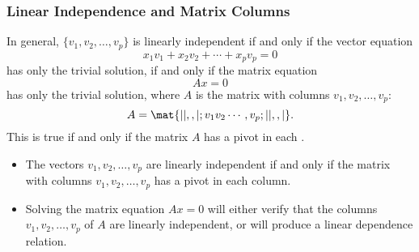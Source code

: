 
\begin{frame}
\frametitle{Linear Independence and Matrix Columns}

In general, $\{v_1,v_2,\ldots,v_p\}$ is linearly independent 
\pause
if and only if the
vector equation
\[ x_1v_1 + x_2v_2 + \cdots + x_pv_p = 0 \]
has only the trivial solution, 
\pause
if and only if the matrix equation
\[ Ax = 0 \]
has only the trivial solution, where $A$ is the matrix
\pause
with columns $v_1,v_2,\ldots,v_p$:
\[ A = \mat{| |, , |; v_1 v_2 \cdots, v_p; | |, , |}. \]
\pause
This is true if and only if the matrix $A$ has a pivot
in each .

\pause[7]\smallskip

\begin{bluebox}[Important]{.9\textwidth}
  \begin{itemize}
  \item The vectors $v_1,v_2,\ldots,v_p$ are linearly independent if and only if
    the matrix with columns $v_1,v_2,\ldots,v_p$ has a pivot in each column.
    \pause
  \item Solving the matrix equation $Ax=0$ will either verify that the columns
    $v_1,v_2,\ldots,v_p$ of $A$ are linearly independent, or will produce
    a linear dependence relation.
  \end{itemize}
\end{bluebox}

\end{frame}





